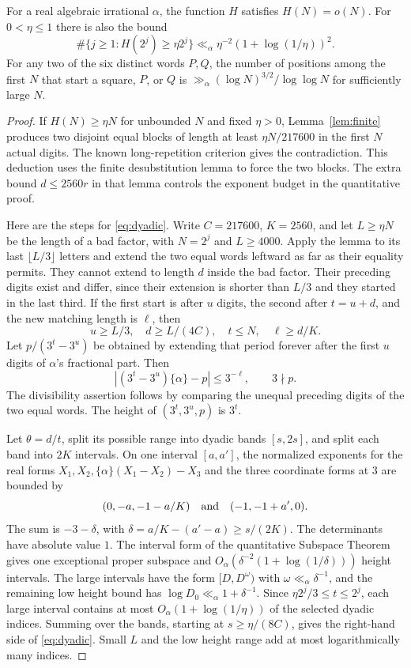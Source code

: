 \begin{theorem}\label{thm:window}
For a real algebraic irrational $\alpha$, the function $H$ satisfies $H(N)=o(N)$. For $0<\eta\le1$ there is also the bound
\begin{equation}\label{eq:dyadic}
 \#\{j\ge1:H(2^j)\ge\eta2^j\}
 \ll_\alpha \eta^{-2}(1+\log(1/\eta))^2 .
\end{equation}
For any two of the six distinct words $P,Q$, the number of positions among the first $N$ that start a square, $P$, or $Q$ is
$\gg_\alpha(\log N)^{3/2}/\log\log N$ for sufficiently large $N$.
\end{theorem}

\begin{proof}
If $H(N)\ge\eta N$ for unbounded $N$ and fixed $\eta>0$, Lemma~\ref{lem:finite} produces two disjoint equal blocks of length at least $\eta N/217600$ in the first $N$ actual digits. The known long-repetition criterion \cite[Theorem~3.3]{Bilu} gives the contradiction. This deduction uses the finite desubstitution lemma to force the two blocks. The extra bound $d\le2560r$ in that lemma controls the exponent budget in the quantitative proof.

Here are the steps for \eqref{eq:dyadic}. Write $C=217600$, $K=2560$, and let $L\ge\eta N$ be the length of a bad factor, with $N=2^j$ and $L\ge4000$. Apply the lemma to its last $\lfloor L/3\rfloor$ letters and extend the two equal words leftward as far as their equality permits. They cannot extend to length $d$ inside the bad factor. Their preceding digits exist and differ, since their extension is shorter than $L/3$ and they started in the last third. If the first start is after $u$ digits, the second after $t=u+d$, and the new matching length is $\ell$, then
\[
 u\ge L/3,\quad d\ge L/(4C),\quad t\le N,\quad \ell\ge d/K .
\]
Let $p/(3^t-3^u)$ be obtained by extending that period forever after the first $u$ digits of $\alpha$'s fractional part. Then
\[
 |(3^t-3^u)\{\alpha\}-p|\le3^{-\ell},\qquad 3\nmid p .
\]
The divisibility assertion follows by comparing the unequal preceding digits of the two equal words. The height of $(3^t,3^u,p)$ is $3^t$.

Let $\theta=d/t$, split its possible range into dyadic bands $[s,2s]$, and split each band into $2K$ intervals. On one interval $[a,a']$, the normalized exponents for the real forms $X_1,X_2,\{\alpha\}(X_1-X_2)-X_3$ and the three coordinate forms at $3$ are bounded by
\[
 (0,-a,-1-a/K)\quad\hbox{and}\quad(-1,-1+a',0).
\]
The sum is $-3-\delta$, with $\delta=a/K-(a'-a)\ge s/(2K)$. The determinants have absolute value $1$. The interval form of the quantitative Subspace Theorem \cite[Theorem 3.3]{EF} gives one exceptional proper subspace and $O_\alpha(\delta^{-2}(1+\log(1/\delta)))$ height intervals. The large intervals have the form $[D,D^\omega)$ with $\omega\ll_\alpha\delta^{-1}$, and the remaining low height bound has $\log D_0\ll_\alpha1+\delta^{-1}$. Since $\eta2^j/3\le t\le2^j$, each large interval contains at most $O_\alpha(1+\log(1/\eta))$ of the selected dyadic indices. Summing over the bands, starting at $s\ge\eta/(8C)$, gives the right-hand side of \eqref{eq:dyadic}. Small $L$ and the low height range add at most logarithmically many indices.


\end{proof}
